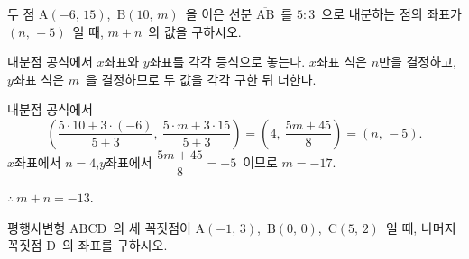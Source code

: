 \documentclass[10pt]{article}
\begin{document}
\newpage


\begin{dmproblem}
두 점 $\mathrm{A}(-6,\, 15)$,\ $\mathrm{B}(10,\, m)$\ 을 이은 선분 $\overline{\mathrm{AB}}$\ 를 $5 : 3$\ 으로 내분하는 점의 좌표가 $(n,\, -5)$\ 일 때, $m + n$\ 의 값을 구하시오.
\end{dmproblem}

\begin{dmapproach}
내분점 공식에서 $x$좌표와 $y$좌표를 각각 등식으로 놓는다. $x$좌표 식은 $n$만을 결정하고, $y$좌표 식은 $m$\ 을 결정하므로 두 값을 각각 구한 뒤 더한다.
\end{dmapproach}

\begin{dmsolution}
내분점 공식에서
\begin{equation*}
  \left( \frac{5 \cdot 10 + 3 \cdot (-6)}{5 + 3},\ \frac{5 \cdot m + 3 \cdot 15}{5 + 3} \right) = \left( 4,\ \frac{5m + 45}{8} \right) = (n,\, -5).
\end{equation*}
$x$좌표에서 $n = 4$,\quad $y$좌표에서 $\dfrac{5m + 45}{8} = -5$\ 이므로 $m = -17$.

$\therefore\ m + n = -13$.
\end{dmsolution}

\dmchecktitle



\newpage


\begin{dmproblem}
평행사변형 $\mathrm{ABCD}$\ 의 세 꼭짓점이 $\mathrm{A}(-1,\, 3)$,\ $\mathrm{B}(0,\, 0)$,\ $\mathrm{C}(5,\, 2)$\ 일 때, 나머지 꼭짓점 $\mathrm{D}$\ 의 좌표를 구하시오.
\end{dmproblem}
\end{document}
